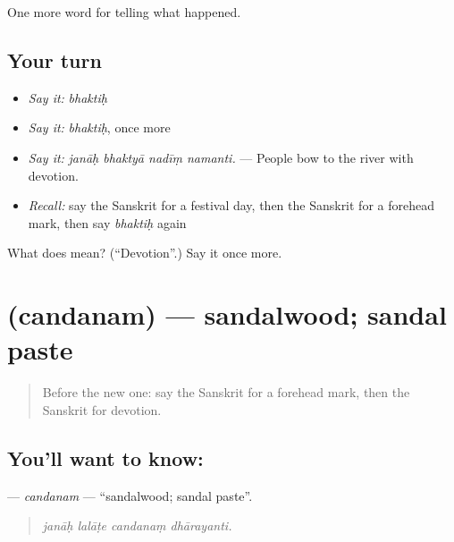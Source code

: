 \begin{grammarlens}[title={What you've built}]
One more word for telling what happened.
\end{grammarlens}

\subsection*{Your turn}
\begin{itemize}
\raggedright
  \item \emph{Say it:} \emph{bhaktiḥ}
  \item \emph{Say it:} \emph{bhaktiḥ}, once more
  \item \emph{Say it:} \emph{janāḥ bhaktyā nadīṃ namanti.} — People bow to the river with devotion.
  \item \emph{Recall:} say the Sanskrit for a festival day, then the Sanskrit for a forehead mark, then say \emph{bhaktiḥ} again
\end{itemize}

\begin{tcolorbox}[breakable,colback=teal!4,colframe=teal!35!black,title={Before you move on}]
What does  mean? (\textquotedblleft{}Devotion\textquotedblright{}.) Say it once more.
\end{tcolorbox}
\section[\texorpdfstring{\sk{चन्दनम्} (candanam)}{चन्दनम् (candanam)}]{ (candanam) — sandalwood; sandal paste}

\label{lesson:SA-C331-candanam}



\begin{quote}
Before the new one: say the Sanskrit for a forehead mark, then the Sanskrit for devotion.
\end{quote}

\subsection*{You'll want to know: }
\textbf{} — \emph{candanam} — \textquotedblleft{}sandalwood; sandal paste\textquotedblright{}.

\begin{quote}
   
\end{quote}

\begin{quote}
\emph{janāḥ lalāṭe candanaṃ dhārayanti.}
\end{quote}

